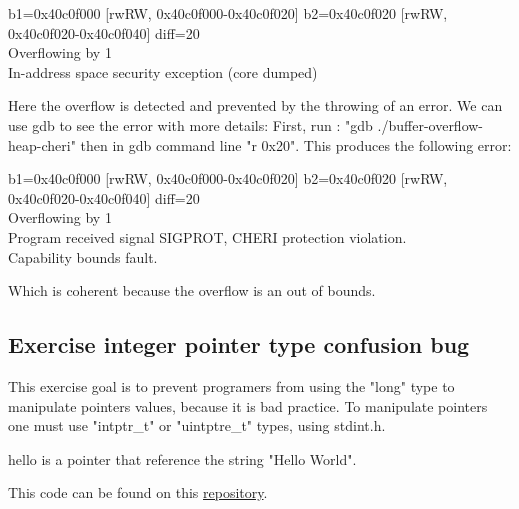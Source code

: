 \documentclass[a4paper, 11pt]{article}
\begin{document}
		\begin{tcolorbox}[colback=gray!5!white, colframe=blue!75!black, title=Heap Overflow with 0x20 as parameter with CHERI protection]
			b1=0x40c0f000 [rwRW, 0x40c0f000-0x40c0f020] b2=0x40c0f020 [rwRW, 0x40c0f020-0x40c0f040] diff=20\\
			Overflowing by 1\\
			In-address space security exception (core dumped)
		\end{tcolorbox}
		Here the overflow is detected and prevented by the throwing of an error.
		We can use gdb to see the error with more details:
		First, run : "gdb ./buffer-overflow-heap-cheri" then in gdb command line "r 0x20".
		This produces the following error:
		\begin{tcolorbox}[colback=gray!5!white, colframe=black!75!black, title=GDB: Heap Overflow with 0x20 as parameter with CHERI protection]
			b1=0x40c0f000 [rwRW, 0x40c0f000-0x40c0f020] b2=0x40c0f020 [rwRW, 0x40c0f020-0x40c0f040] diff=20\\
			Overflowing by 1\\
			
			Program received signal SIGPROT, CHERI protection violation.\\
			Capability bounds fault.
		\end{tcolorbox}
		Which is coherent because the overflow is an out of bounds.
	
	\subsection{Exercise integer pointer type confusion bug}
	This exercise goal is to prevent programers from using the "long" type to manipulate pointers values, because it is bad practice.  
		To manipulate pointers one must use "intptr\_t" or "uintptre\_t" types, using stdint.h. 
		
		hello is a pointer that reference the string "Hello World". 
		

		This code can be found on this \href{https://ctsrd-cheri.github.io/cheri-exercises/exercises/type-confusion/}{repository}.
    
\end{document}
